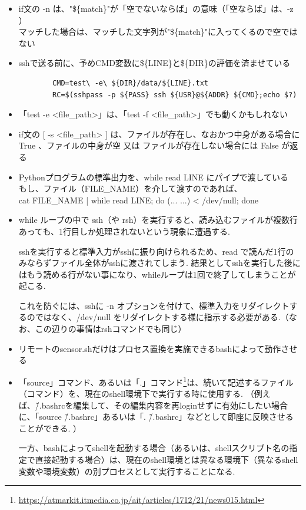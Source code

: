 \documentclass[12pt,a4paper,uplatex]{jsbook}
\begin{document}
\begin{itemize}
	\item if文の -n は、"\$\{match\}"が「空でないならば」の意味（「空ならば」は、-z ）\\マッチした場合は、マッチした文字列が"\$\{match\}"に入ってくるので空ではない
	\item sshで送る前に、予めCMD変数に\$\{LINE\}と\$\{DIR\}の評価を済ませている
	\begin{verbatim}
		CMD=test\ -e\ ${DIR}/data/${LINE}.txt
		RC=$(sshpass -p ${PASS} ssh ${USR}@${ADDR} ${CMD};echo $?)
	\end{verbatim}
	\item 「test -e <file\_path>」は、「test -f <file\_path>」でも動くかもしれない\\
	\item if文の [ -s <file\_path> ] は、ファイルが存在し、なおかつ中身がある場合に True 、ファイルの中身が空 又は ファイルが存在しない場合には False が返る 
	\item Pythonプログラムの標準出力を、while read LINE にパイプで渡している\\もし、ファイル（FILE\_NAME）を介して渡すのであれば、\\ cat FILE\_NAME | while read LINE; do (... ...) < /dev/null; done
	\item while ループの中で ssh（や rsh）を実行すると、読み込むファイルが複数行あっても、1行目しか処理されないという現象に遭遇する.
	
	sshを実行すると標準入力がsshに振り向けられるため、read で読んだ1行のみならずファイル全体がsshに渡されてしまう. 結果としてsshを実行した後にはもう読める行がない事になり、whileループは1回で終了してしまうことが起こる.
	
	これを防ぐには、sshに -n オプションを付けて、標準入力をリダイレクトするのではなく、/dev/null をリダイレクトする様に指示する必要がある.（なお、この辺りの事情はrshコマンドでも同じ）
	\item リモートのsensor.shだけはプロセス置換を実施できるbashによって動作させる %
	\item 「source」コマンド、あるいは「.」コマンド\footnote{\url{https://atmarkit.itmedia.co.jp/ait/articles/1712/21/news015.html}}は、続いて記述するファイル（コマンド）を、現在のshell環境下で実行する時に使用する. （例えば、\~/.bashrcを編集して、その編集内容を再loginせずに有効にしたい場合に、「source \~/.bashrc」あるいは「. \~/.bashrc」などとして即座に反映させることができる. ）
	
	一方、bashによってshellを起動する場合（あるいは、shellスクリプト名の指定で直接起動する場合）は、現在のshell環境とは異なる環境下（異なるshell変数や環境変数）の別プロセスとして実行することになる.
	

\end{itemize}
\end{document}
